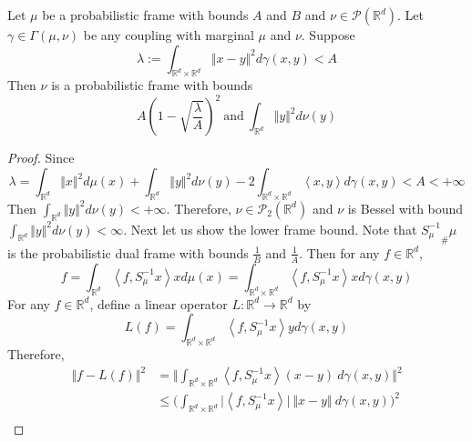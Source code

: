 \documentclass[10pt,a4paper]{amsart}
\begin{document}
\begin{proposition}
Let $\mu$ be a probabilistic frame with bounds  $A$ and $B$ and $\nu \in \mathcal{P}(\mathbb{R}^d)$. Let $\gamma \in \Gamma(\mu, \nu)$ be any coupling with marginal $\mu$ and $\nu$. Suppose 
\begin{equation*}
   \lambda:= \int_{\mathbb{R}^d  \times \mathbb{R}^d} \Vert x-y \Vert^2  d \gamma(x, y) < A 
\end{equation*}
Then $\nu$ is a probabilistic frame with bounds
  \begin{equation*}
    A (1-\sqrt{\frac{\lambda}{A}})^2   \ \text{and} \ \int_{\mathbb{R}^d} \Vert y \Vert^2 d \nu(y)
 \end{equation*}
\end{proposition}

\begin{proof}
Since  
\begin{equation*}
  \lambda = \int_{\mathbb{R}^d} \Vert x \Vert^2 d \mu(x) +  \int_{\mathbb{R}^d} \Vert y \Vert^2  d \nu(y) -2 \int_{\mathbb{R}^d \times \mathbb{R}^d}  \left\langle x, y \right\rangle d \gamma(x, y) < A < +\infty
\end{equation*}
Then $\int_{\mathbb{R}^d} \Vert y \Vert^2  d \nu(y) < +\infty$. Therefore, $\nu \in \mathcal{P}_2(\mathbb{R}^d)$ and $\nu$ is Bessel with bound  $\int_{\mathbb{R}^d} \Vert y \Vert^2 d \nu(y) < \infty$. Next let us show the lower frame bound. Note that $ {S_\mu^{-1}}_{\#} \mu$ is the probabilistic dual frame with bounds $\frac{1}{B}$ and $\frac{1}{A}$. Then  for any $f \in \mathbb{R}^d$,
\begin{equation*}
   f=  \int_{\mathbb{R}^d} \left\langle f,  S_\mu^{-1} x \right\rangle x   d\mu(x) = \int_{\mathbb{R}^d \times \mathbb{R}^d} \left\langle f,  S_\mu^{-1} x \right\rangle x  d\gamma(x,y)
\end{equation*}
For any $f \in \mathbb{R}^d$, define a linear operator $L: \mathbb{R}^d \rightarrow \mathbb{R}^d$ by 
     \begin{equation*}
         L(f) = \int_{\mathbb{R}^d \times \mathbb{R}^d} \left\langle f,  S_\mu^{-1} x \right\rangle  y  d\gamma(x,y) 
     \end{equation*}
Therefore, 
\begin{equation*}
\begin{split}
    \Vert f -L(f) \Vert^2 &= \Big \Vert \int_{\mathbb{R}^d \times \mathbb{R}^d} \left\langle f, S_\mu^{-1} x \right\rangle (x-y) \ d \gamma(x, y) \Big \Vert ^2 \\
    &\leq \Big ( \int_{\mathbb{R}^d \times \mathbb{R}^d} \vert \left\langle f, S_\mu^{-1} x \right\rangle \vert  \ \Vert x-y \Vert \ d \gamma(x, y)  \Big )^2 \\

\end{split}
\end{equation*}
\end{proof}
\end{document}
